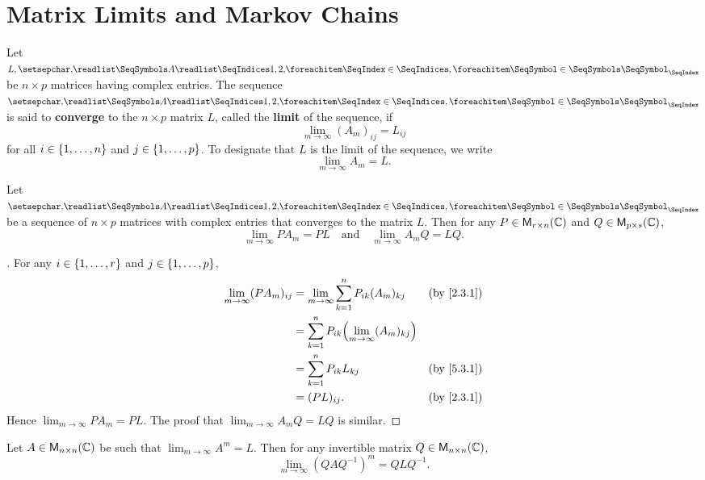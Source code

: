 \section{Matrix Limits and Markov Chains}\label{sec:5.3}

\begin{defn}\label{5.3.1}
	Let \(L, \seq{A}{1,2,}\) be \(n \times p\) matrices having complex entries.
	The sequence \(\seq{A}{1,2,}\) is said to \textbf{converge} to the \(n \times p\) matrix \(L\), called the \textbf{limit} of the sequence, if
	\[
		\lim_{m \to \infty} (A_m)_{i j} = L_{i j}
	\]
	for all \(i \in \left\lbrace1, \dots, n\right\rbrace\) and \(j \in \left\lbrace1, \dots, p\right\rbrace\).
	To designate that \(L\) is the limit of the sequence, we write
	\[
		\lim_{m \to \infty} A_m = L.
	\]
\end{defn}

\begin{thm}\label{5.12}
	Let \(\seq{A}{1,2,}\) be a sequence of \(n \times p\) matrices with complex entries that converges to the matrix \(L\).
	Then for any \(P \in \mathsf{M}_{{r} \times n}({\mathbb{C}})\) and \(Q \in \mathsf{M}_{{p} \times s}({\mathbb{C}})\),
	\[
		\lim_{m \to \infty} P A_m = PL \quad \text{and} \quad \lim_{m \to \infty} A_m Q = LQ.
	\]
\end{thm}

\begin{proof}[]
	For any \(i \in \left\lbrace1, \dots, r\right\rbrace\) and \(j \in \left\lbrace1, \dots, p\right\rbrace\),
	\begin{align*}
		\lim_{m \to \infty} (P A_m)_{i j} & = \lim_{m \to \infty} \sum_{k = 1}^n P_{i k} (A_m)_{k j}      &  & \by{2.3.1} \\
		                                  & = \sum_{k = 1}^n P_{i k} \pa{\lim_{m \to \infty} (A_m)_{k j}}                 \\
		                                  & = \sum_{k = 1}^n P_{i k} L_{k j}                              &  & \by{5.3.1} \\
		                                  & = (PL)_{i j}.                                                 &  & \by{2.3.1}
	\end{align*}
	Hence \(\lim_{m \to \infty} P A_m = PL\).
	The proof that \(\lim_{m \to \infty} A_m Q = LQ\) is similar.
\end{proof}

\begin{cor}\label{5.3.2}
	Let \(A \in \mathsf{M}_{{n} \times n}({\mathbb{C}})\) be such that \(\lim_{m \to \infty} A^m = L\).
	Then for any invertible matrix \(Q \in \mathsf{M}_{{n} \times n}({\mathbb{C}})\),
	\[
		\lim_{m \to \infty} (Q A Q^{-1})^m = Q L Q^{-1}.
	\]
\end{cor}

